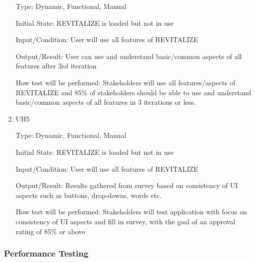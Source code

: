 \documentclass[12pt, titlepage]{article}
\begin{document}
\begin{enumerate}
Type: Dynamic, Functional, Manual
					
Initial State: REVITALIZE is loaded but not in use
					
Input/Condition: User will use all features of REVITALIZE
					
Output/Result: User can use and understand basic/common aspects of all features after 3rd iteration
					
How test will be performed: Stakeholders will use all features/aspects of REVITALIZE and 85\% of stakeholders should be able to use and understand basic/common aspects of all features in 3 iterations or less.

\item{UH5\\}

Type: Dynamic, Functional, Manual
					
Initial State: REVITALIZE is loaded but not in use
					
Input/Condition: User will use all features of REVITALIZE
					
Output/Result: Results gathered from survey based on consistency of UI aspects such as buttons, drop-downs, words etc.
					
How test will be performed: Stakeholders will test application with focus on consistency of UI aspects and fill in survey, with the goal of an approval rating of 85\% or above

\end{enumerate}

\subsubsection{Performance Testing}
\end{document}
